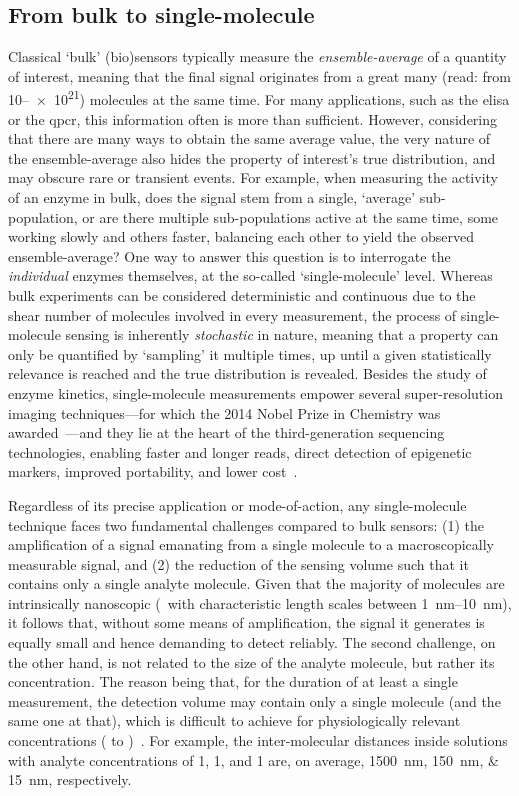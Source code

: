 \subsection{From bulk to single-molecule}

Classical `bulk' (bio)sensors typically measure the \emph{ensemble-average} of a quantity of interest, meaning
that the final signal originates from a great many (read: from \numrange{10}{e21}) molecules at the same time.
For many applications, such as the \gls{elisa} or the \gls{qpcr}, this information often is more than
sufficient. However, considering that there are many ways to obtain the same average value, the very nature of
the ensemble-average also hides the property of interest's true distribution, and may obscure rare or
transient events. For example, when measuring the activity of an enzyme in bulk, does the signal stem from a
single, `average' sub-population, or are there multiple sub-populations active at the same time, some working
slowly and others faster, balancing each other to yield the observed ensemble-average? One way to answer this
question is to interrogate the \emph{individual} enzymes themselves, at the so-called `single-molecule' level.
Whereas bulk experiments can be considered deterministic and continuous due to the shear number of molecules
involved in every measurement, the process of single-molecule sensing is inherently \emph{stochastic} in
nature, meaning that a property can only be quantified by `sampling' it multiple times, up until a given
statistically relevance is reached and the true distribution is revealed. Besides the study of enzyme
kinetics, single-molecule measurements empower several super-resolution imaging techniques---for which the
2014 Nobel Prize in Chemistry was awarded~\cite{Weiss-2014}---and they lie at the heart of the
third-generation sequencing technologies, enabling faster and longer reads, direct detection of epigenetic
markers, improved portability, and lower cost~\cite{Schadt-2010}.

Regardless of its precise application or mode-of-action, any single-molecule technique faces two fundamental
challenges compared to bulk sensors: (1) the amplification of a signal emanating from a single molecule to a
macroscopically measurable signal, and (2) the reduction of the sensing volume such that it contains only a
single analyte molecule. Given that the majority of molecules are intrinsically nanoscopic (\ie~with
characteristic length scales between \SIrange[range-phrase= and ]{1}{10}{\nm}), it follows that, without
some means of amplification, the signal it generates is equally small and hence demanding to detect reliably.
The second challenge, on the other hand, is not related to the size of the analyte molecule, but rather its
concentration. The reason being that, for the duration of at least a single measurement, the detection volume
may contain only a single molecule (and the same one at that), which is difficult to achieve for
physiologically relevant concentrations (\si{\uM} to \si{\mM})~\cite{Zhu-2012}. For example, the
inter-molecular distances inside solutions with analyte concentrations of \SI{1}{\nM}, \SI{1}{\uM}, and
\SI{1}{\mM} are, on average, \SIlist{1500;150;15}{\nm}, respectively.


